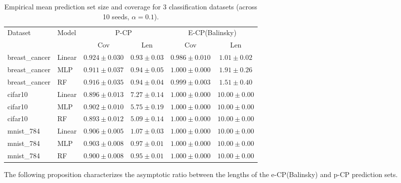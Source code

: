 \documentclass{article}
\theoremstyle{plain}
\theoremstyle{definition}
\theoremstyle{remark}
\begin{document}
\begin{table}[h]
\centering
\begin{tabular}{llcccc}
\toprule
\multirow{2}{*}{Dataset} & \multirow{2}{*}{Model} & \multicolumn{2}{c}{P-CP} & \multicolumn{2}{c}{E-CP(Balinsky)} \\
\cmidrule(lr){3-4}\cmidrule(lr){5-6}
 &  & Cov & Len & Cov & Len \\
\midrule
breast\_cancer & Linear & $0.924 \pm 0.030$ & $0.93 \pm 0.03$ & $0.986 \pm 0.010$ & $1.01 \pm 0.02$ \\
breast\_cancer & MLP    & $0.911 \pm 0.037$ & $0.94 \pm 0.05$ & $1.000 \pm 0.000$ & $1.91 \pm 0.26$ \\
breast\_cancer & RF     & $0.916 \pm 0.035$ & $0.94 \pm 0.04$ & $0.999 \pm 0.003$ & $1.51 \pm 0.40$ \\
\addlinespace
cifar10       & Linear & $0.896 \pm 0.013$ & $7.27 \pm 0.14$ & $1.000 \pm 0.000$ & $10.00 \pm 0.00$ \\
cifar10       & MLP    & $0.902 \pm 0.010$ & $5.75 \pm 0.19$ & $1.000 \pm 0.000$ & $10.00 \pm 0.00$ \\
cifar10       & RF     & $0.893 \pm 0.012$ & $5.09 \pm 0.14$ & $1.000 \pm 0.000$ & $10.00 \pm 0.00$ \\
\addlinespace
mnist\_784    & Linear & $0.906 \pm 0.005$ & $1.07 \pm 0.03$ & $1.000 \pm 0.000$ & $10.00 \pm 0.00$ \\
mnist\_784    & MLP    & $0.903 \pm 0.008$ & $0.97 \pm 0.01$ & $1.000 \pm 0.000$ & $10.00 \pm 0.00$ \\
mnist\_784    & RF     & $0.900 \pm 0.008$ & $0.95 \pm 0.01$ & $1.000 \pm 0.000$ & $10.00 \pm 0.00$ \\
\bottomrule
\end{tabular}
\caption{Empirical mean prediction set size and coverage for 3 classification datasets (across 10 seeds, $\alpha=0.1$). }
\label{appendix:table_classification}
\end{table}


The following proposition characterizes the asymptotic ratio between the lengths of the e-CP(Balinsky) and p-CP prediction sets.
\end{document}
